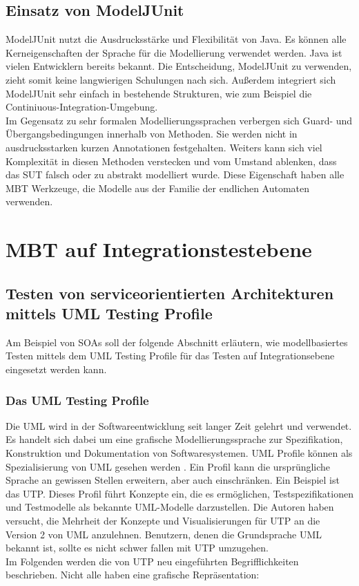 \subsection{Einsatz von ModelJUnit}
ModelJUnit nutzt die Ausdrucksstärke und Flexibilität von Java. Es können alle Kerneigenschaften der Sprache für die Modellierung verwendet werden. Java ist vielen Entwicklern bereits bekannt. Die Entscheidung, ModelJUnit zu verwenden, zieht somit keine langwierigen Schulungen nach sich. Außerdem integriert sich ModelJUnit sehr einfach in bestehende Strukturen, wie zum Beispiel die Continiuous-Integration-Umgebung.\\
Im Gegensatz zu sehr formalen Modellierungssprachen verbergen sich Guard- und Übergangsbedingungen innerhalb von Methoden. Sie werden nicht in ausdrucksstarken kurzen Annotationen festgehalten. Weiters kann sich viel Komplexität in diesen Methoden verstecken und vom Umstand ablenken, dass das \Gls{SUT} falsch oder zu abstrakt modelliert wurde. Diese Eigenschaft haben alle \Gls{MBT} Werkzeuge, die Modelle aus der Familie der endlichen Automaten verwenden.

\section{MBT auf Integrationstestebene}
\label{sec:mbt_integration}

\subsection{Testen von serviceorientierten Architekturen mittels UML Testing Profile}
\label{sec:utp}
Am Beispiel von \glspl{SOA} soll der folgende Abschnitt erläutern, wie modellbasiertes Testen mittels dem UML Testing Profile für das Testen auf Integrationsebene eingesetzt werden kann. 

\subsubsection{Das UML Testing Profile}
Die \Gls{UML} wird in der Softwareentwicklung seit langer Zeit gelehrt und verwendet. Es handelt sich dabei um eine grafische Modellierungssprache zur Spezifikation, Konstruktion und Dokumentation von Softwaresystemen. \Gls{UML} Profile können als Spezialisierung von \Gls{UML} gesehen werden \cite{_model-driven_2007}. Ein Profil kann die ursprüngliche Sprache an gewissen Stellen erweitern, aber auch einschränken. Ein Beispiel ist das \Gls{UTP}. Dieses Profil führt Konzepte ein, die es ermöglichen, Testspezifikationen und Testmodelle als bekannte \Gls{UML}-Modelle darzustellen. Die Autoren \cite{_model-driven_2007} haben versucht, die Mehrheit der Konzepte und Visualisierungen für \Gls{UTP} an die Version 2 von \Gls{UML} anzulehnen. Benutzern, denen die Grundsprache \Gls{UML} bekannt ist, sollte es nicht schwer fallen mit \gls{UTP} umzugehen.\\
Im Folgenden werden die von \Gls{UTP} neu eingeführten Begrifflichkeiten beschrieben. Nicht alle haben eine grafische Repräsentation:

